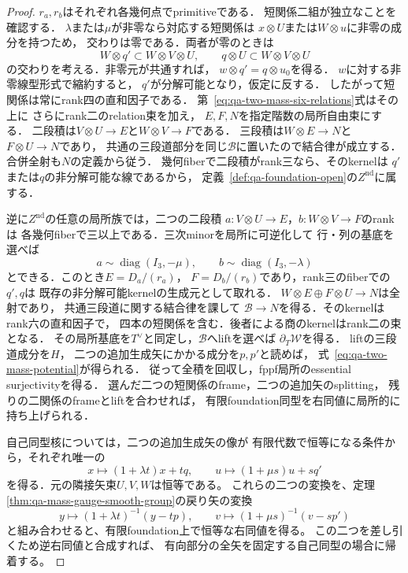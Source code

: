 \begin{proof}
$r_a,r_b$はそれぞれ各幾何点でprimitiveである．
短関係二組が独立なことを確認する．
$\lambda$または$\mu$が非零なら対応する短関係は
$x\otimes U$または$W\otimes u$に非零の成分を持つため，
交わりは零である．両者が零のときは
\[
 W\otimes q'\subset W\otimes V\otimes U,\qquad
 q\otimes U\subset W\otimes V\otimes U
\]
の交わりを考える．非零元が共通すれば，
$w\otimes q'=q\otimes u_0$を得る．
$w$に対する非零線型形式で縮約すると，
$q'$が分解可能となり，仮定に反する．
したがって短関係は常にrank四の直和因子である．
第~\eqref{eq:qa-two-mass-six-relations}式はその上に
さらにrank二のrelation束を加え，
$E,F,N$を指定階数の局所自由束にする．
二段積は$V\otimes U\to E$と$W\otimes V\to F$である．
三段積は$W\otimes E\to N$と$F\otimes U\to N$であり，
共通の三段道部分を同じ$\mathcal B$に置いたので結合律が成立する．
合併全射も$N$の定義から従う．
幾何fiberで二段積がrank三なら、そのkernelは
$q'$または$q$の非分解可能な線であるから，
定義~\ref{def:qa-foundation-open}の$Z^{\mathrm{nd}}$に属する．

逆に$Z^{\mathrm{nd}}$の任意の局所族では，二つの二段積
$a:V\otimes U\to E$，$b:W\otimes V\to F$のrankは
各幾何fiberで三以上である．三次minorを局所に可逆化して
行・列の基底を選べば
\[
 a\sim\operatorname{diag}(I_3,-\mu),\qquad
 b\sim\operatorname{diag}(I_3,-\lambda)
\]
とできる．このとき$E=D_a/(r_a)$，
$F=D_b/(r_b)$であり，rank三のfiberでの$q',q$は
既存の非分解可能kernelの生成元として取れる．
$W\otimes E\oplus F\otimes U\to N$は全射であり，
共通三段道に関する結合律を課して
$\mathcal B\to N$を得る．そのkernelはrank六の直和因子で，
四本の短関係を含む．後者による商のkernelはrank二の束となる．
その局所基底を$T^\vee$と同定し，$\mathcal B$へliftを選べば
$\partial_T\mathcal W$を得る．
liftの三段道成分を$H$，
二つの追加生成矢にかかる成分を$p,p'$と読めば，
式~\eqref{eq:qa-two-mass-potential}が得られる．
従って全積を回収し，fppf局所のessential surjectivityを得る．
選んだ二つの短関係のframe，二つの追加矢のsplitting，
残りの二関係のframeとliftを合わせれば，
有限foundation同型を右同値に局所的に持ち上げられる．

自己同型核については，二つの追加生成矢の像が
有限代数で恒等になる条件から，それぞれ唯一の
\[
 x\mapsto(1+\lambda t)x+tq,\qquad
 u\mapsto(1+\mu s)u+sq'
\]
を得る．元の隣接矢束$U,V,W$は恒等である。
これらの二つの変換を、定理~
\ref{thm:qa-mass-gauge-smooth-group}の戻り矢の変換
\[
 y\mapsto(1+\lambda t)^{-1}(y-tp),\qquad
 v\mapsto(1+\mu s)^{-1}(v-sp')
\]
と組み合わせると、有限foundation上で恒等な右同値を得る。
この二つを差し引くため逆右同値と合成すれば、
有向部分の全矢を固定する自己同型の場合に帰着する。


\end{proof}
